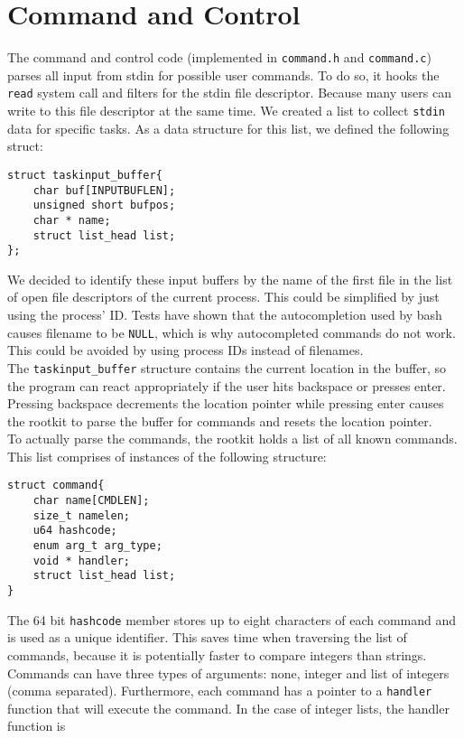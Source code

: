 \section{Command and Control}\label{cnc}
The command and control code (implemented in \verb+command.h+ and \verb+command.c+) 
parses all input from stdin for possible user 
commands. To do so, it hooks the \texttt{read} system call and filters for the 
stdin file descriptor. Because many users can write to this file descriptor at 
the same time. We created a list to collect \texttt{stdin} data for specific tasks.
As a data structure for this list, we defined the following struct:
\lstset{escapechar=,style=customc}
\begin{lstlisting}
struct taskinput_buffer{
	char buf[INPUTBUFLEN];
	unsigned short bufpos;
	char * name;
	struct list_head list;
};
\end{lstlisting}
We decided to identify these input buffers by the name of the first 
file in the list of open file descriptors of the current process. 
This could be simplified by just using the process' ID.
Tests have shown that the autocompletion used by bash causes filename to be 
\texttt{NULL}, which is why autocompleted commands do not work. This could be 
avoided by using process IDs instead of filenames.\\
The \verb+taskinput_buffer+ structure contains the current location 
in the buffer, so the program can react appropriately if the user hits 
backspace or presses enter. Pressing backspace decrements the location pointer 
while pressing enter causes the rootkit to parse the buffer for commands and 
resets the location pointer.\\
To actually parse the commands, the rootkit holds a list of all known commands. 
This list comprises of instances of the following structure:
\lstset{escapechar=,style=customc}
\begin{lstlisting}
struct command{
	char name[CMDLEN];
	size_t namelen;
	u64 hashcode;
	enum arg_t arg_type;
	void * handler;
	struct list_head list;
}
\end{lstlisting}
The 64 bit \texttt{hashcode} member stores up to eight characters of 
each command and is used as a unique identifier. This saves time when traversing 
the list of commands, because it is potentially faster to compare integers than 
strings. Commands can have three types of arguments: none, integer and list of 
integers (comma separated).
Furthermore, each command has a pointer to a \texttt{handler} function that 
will execute the command. In the case of integer lists, the handler function is 
